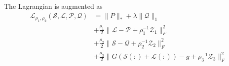 \documentclass[a4paper,12pt]{article}
\theoremstyle{mystyle}
\begin{document}
\begin{CJK*}{GBK}{song}
The Lagrangian is augmented as
\begin{align}
\mathcal{L}_{\rho_1,\rho_2}(\mathcal{S},\mathcal{L},\mathcal{P},\mathcal{Q})
&=\|P\|_*+\lambda \|\mathcal{Q}\|_1\\
&+\frac{\rho_1}{2}\|\mathcal{L-P}+\rho_1^{-1}\mathcal{Z}_1\|_{F}^2\\
&+\frac{\rho_2}{2}\|\mathcal{S-Q}+\rho_2^{-1}\mathcal{Z}_2\|_{F}^2\\
&+\frac{\rho_3}{2}\|G\mathcal{(S(:)+L(:))}-g+\rho_3^{-1}\mathcal{Z}_3\|_{F}^2
\end{align}


\end{CJK*}
\end{document}
